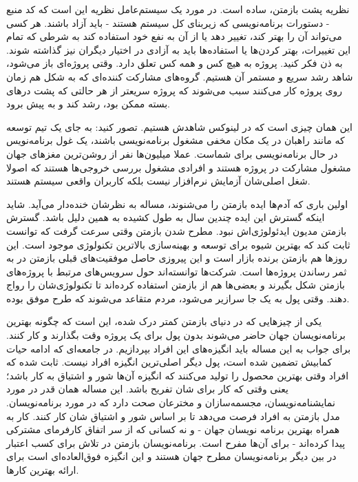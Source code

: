 نظریه پشت بازمتن، ساده است. در مورد یک سیستم‌عامل نظریه این است که کد
منبع - دستورات برنامه‌نویسی که زیربنای کل سیستم هستند - باید آزاد
باشند. هر کسی می‌تواند آن را بهتر کند، تغییر دهد یا از آن به نفع خود
استفاده کند به شرطی که تمام این تغییرات، بهتر کردن‌ها یا استفاده‌ها باید
به آزادی در اختیار دیگران نیز گذاشته شوند. به ذن فکر کنید. پروژه به
هیچ کس و همه کس تعلق دارد. وقتی پروژه‌ای باز می‌شود، شاهد رشد سریع و
مستمر آن هستیم. گروه‌های مشارکت کننده‌ای که به شکل هم زمان روی پروژه کار
می‌کنند سبب می‌شوند که پروژه سریعتر از هر حالتی که پشت درهای بسته ممکن
بود، رشد کند و به پیش برود.

این همان چیزی است که در لینوکس شاهدش هستیم.  تصور کنید: به جای یک تیم
توسعه که مانند راهبان در یک مکان مخفی مشغول برنامه‌نویسی باشند، یک غول
برنامه‌نویس در حال برنامه‌نویسی برای شماست. عملا میلیون‌ها نفر از
روشن‌ترین مغزهای جهان مشغول مشارکت در پروژه هستند و افرادی مشغول بررسی
خروجی‌ها هستند که اصولا شغل اصلی‌شان آزمایش نرم‌افزار نیست بلکه کاربران
واقعی سیستم هستند.

اولین باری که آدم‌ها ایده بازمتن را می‌شنوند، مساله به نظرشان خنده‌‌دار
می‌آید. شاید اینکه گسترش این ایده چندین سال به طول کشیده به همین دلیل
باشد. گسترش بازمتن مدیون ایدئولوژی‌اش نبود. مطرح شدن بازمتن وقتی سرعت
گرفت که توانست ثابت کند که بهترین شیوه برای توسعه و بهینه‌سازی بالاترین
تکنولوژی موجود است. این روزها هم بازمتن برنده بازار است و این پیروزی
حاصل موفقیت‌های قبلی بازمتن در به ثمر رساندن پروژه‌ها است. شرکت‌ها
توانسته‌اند حول سرویس‌های مرتبط با پروژه‌های بازمتن شکل بگیرند و بعضی‌ها
هم از بازمتن استفاده کرده‌اند تا تکنولوژی‌شان را رواج دهند. وقتی پول به
یک جا سرازیر می‌شود، مردم متقاعد می‌شوند که طرح موفق بوده.

یکی از چیزهایی که در دنیای بازمتن کمتر درک شده، این است که چگونه
بهترین برنامه‌نویسان جهان حاضر می‌شوند بدون پول برای یک پروژه وقت
بگذارند و کار کنند. برای جواب به این مساله باید انگیزه‌های این افراد
بپردازیم. در جامعه‌ای که ادامه حیات کمابیش تضمین شده است، پول دیگر
اصلی‌ترین انگیزه افراد نیست. ثابت شده که افراد وقتی بهترین محصول را
تولید می‌کنند که انگیزه‌ آن‌ها شور و اشتیاق به کار باشد؛ یعنی وقتی که کار
برای شان تفریح باشد. این مساله همان قدر در مورد نمایشنامه‌نویسان،
مجسمه‌سازان و مخترعان صحت دارد که در مورد برنامه‌نویسان. مدل بازمتن به
افراد فرصت می‌دهد تا بر اساس شور و اشتیاق شان کار کنند. کار به همراه
بهترین برنامه نویسان جهان - و نه کسانی که از سر اتفاق کارفرمای مشترکی
پیدا کرده‌اند - برای آن‌ها مفرح است. برنامه‌نویسان بازمتن در تلاش برای
کسب اعتبار در بین دیگر برنامه‌نویسان مطرح جهان هستند و این انگیزه
فوق‌العاده‌ای است برای ارائه بهترین کارها.

